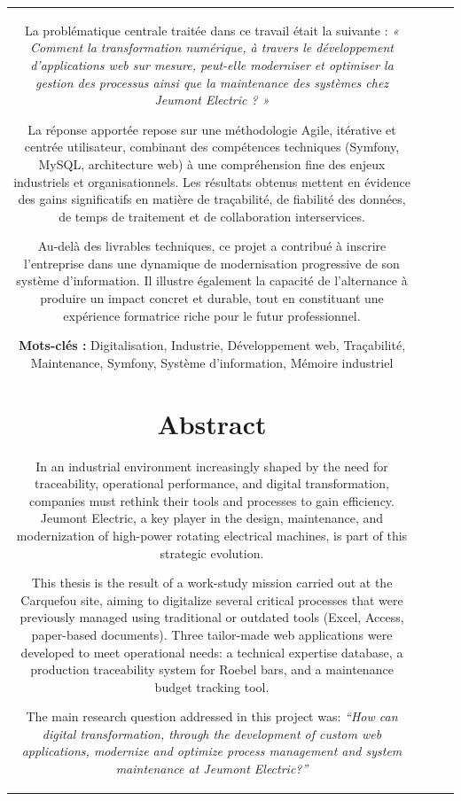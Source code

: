 \documentclass[11pt,a4paper]{article}
\begin{document}
\begin{table}[H]
\begin{tabular}{|c|p{5cm}|p{7cm}|c|}
La problématique centrale traitée dans ce travail était la suivante :
\textit{« Comment la transformation numérique, à travers le développement d'applications web sur mesure, peut-elle moderniser et optimiser la gestion des processus ainsi que la maintenance des systèmes chez Jeumont Electric ? »}

La réponse apportée repose sur une méthodologie Agile, itérative et centrée utilisateur, combinant des compétences techniques (Symfony, MySQL, architecture web) à une compréhension fine des enjeux industriels et organisationnels. Les résultats obtenus mettent en évidence des gains significatifs en matière de traçabilité, de fiabilité des données, de temps de traitement et de collaboration interservices.

Au-delà des livrables techniques, ce projet a contribué à inscrire l’entreprise dans une dynamique de modernisation progressive de son système d’information. Il illustre également la capacité de l’alternance à produire un impact concret et durable, tout en constituant une expérience formatrice riche pour le futur professionnel.

\bigskip

\noindent\textbf{Mots-clés :} Digitalisation, Industrie, Développement web, Traçabilité, Maintenance, Symfony, Système d'information, Mémoire industriel

\newpage
\section*{Abstract}
\addcontentsline{toc}{section}{Abstract}

In an industrial environment increasingly shaped by the need for traceability, operational performance, and digital transformation, companies must rethink their tools and processes to gain efficiency. Jeumont Electric, a key player in the design, maintenance, and modernization of high-power rotating electrical machines, is part of this strategic evolution.

This thesis is the result of a work-study mission carried out at the Carquefou site, aiming to digitalize several critical processes that were previously managed using traditional or outdated tools (Excel, Access, paper-based documents). Three tailor-made web applications were developed to meet operational needs: a technical expertise database, a production traceability system for Roebel bars, and a maintenance budget tracking tool.

The main research question addressed in this project was:
\textit{“How can digital transformation, through the development of custom web applications, modernize and optimize process management and system maintenance at Jeumont Electric?”}


\end{tabular}
\end{table}
\end{document}
